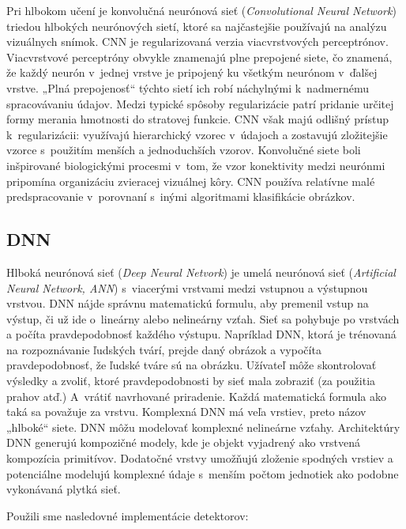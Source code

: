 \documentclass[]{article}
\begin{document}
	Pri hlbokom učení je konvolučná neurónová sieť (\textit{Convolutional Neural Network}) triedou hlbokých neurónových sietí, ktoré sa najčastejšie používajú na analýzu vizuálnych snímok. CNN je regularizovaná verzia viacvrstvových perceptrónov. Viacvrstvové perceptróny obvykle znamenajú plne prepojené siete, čo znamená, že každý neurón v~jednej vrstve je pripojený ku všetkým neurónom v~ďalšej vrstve. „Plná prepojenosť“ týchto sietí ich robí náchylnými k~nadmernému spracovávaniu údajov. Medzi typické spôsoby regularizácie patrí pridanie určitej formy merania hmotnosti do stratovej funkcie. CNN však majú odlišný prístup k~regularizácii: využívajú hierarchický vzorec v~údajoch a zostavujú zložitejšie vzorce s~použitím menších a jednoduchších vzorov. Konvolučné siete boli inšpirované biologickými procesmi v~tom, že vzor konektivity medzi neurónmi pripomína organizáciu zvieracej vizuálnej kôry. CNN používa relatívne malé predspracovanie v~porovnaní s~inými algoritmami klasifikácie obrázkov.
	
	\subsection*{DNN}
	
	Hlboká neurónová sieť (\textit{Deep Neural Netvork}) je umelá neurónová sieť (\textit{Artificial Neural Network, ANN}) s~viacerými vrstvami medzi vstupnou a výstupnou vrstvou. DNN nájde správnu matematickú formulu, aby premenil vstup na výstup, či už ide o~lineárny alebo nelineárny vzťah. Sieť sa pohybuje po vrstvách a počíta pravdepodobnosť každého výstupu. Napríklad DNN, ktorá je trénovaná na rozpoznávanie ľudských tvárí, prejde daný obrázok a vypočíta pravdepodobnosť, že ľudské tváre sú na obrázku. Užívateľ môže skontrolovať výsledky a zvoliť, ktoré pravdepodobnosti by sieť mala zobraziť (za použitia prahov atď.) A~vrátiť navrhované priradenie. Každá matematická formula ako taká sa považuje za vrstvu. Komplexná DNN má veľa vrstiev, preto názov „hlboké“ siete.
	DNN môžu modelovať komplexné nelineárne vzťahy. Architektúry DNN generujú kompozičné modely, kde je objekt vyjadrený ako vrstvená kompozícia primitívov. Dodatočné vrstvy umožňujú zloženie spodných vrstiev a potenciálne modelujú komplexné údaje s~menším počtom jednotiek ako podobne vykonávaná plytká sieť.
	
	\newpage
	Použili sme nasledovné implementácie detektorov: 
	
\end{document}
